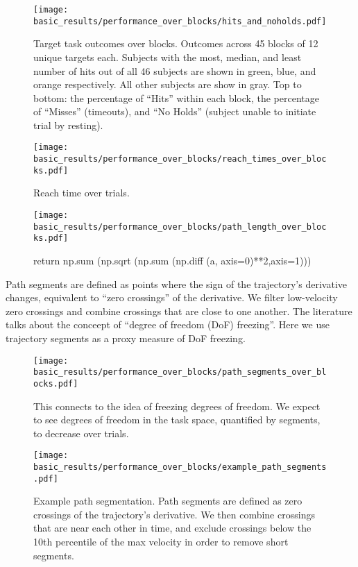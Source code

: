 \documentclass[../main.tex]{subfiles}
\begin{document}
\begin{figure}[H]%
    \centering
    \texttt{[image: basic\_results/performance\_over\_blocks/hits\_and\_noholds.pdf]}
    \caption[Hit counts over trials]{Target task outcomes over blocks. Outcomes across 45 blocks of 12 unique targets each. Subjects with the most, median, and least number of hits out of all 46 subjects are shown in green, blue, and orange respectively. All other subjects are show in gray. Top to bottom: the percentage of ``Hits'' within each block, the percentage of ``Misses'' (timeouts), and ``No Holds'' (subject unable to initiate trial by resting).}\label{fig:hits_and_noholds}
\end{figure}


\begin{figure}[H]%
    \centering
    \texttt{[image: basic\_results/performance\_over\_blocks/reach\_times\_over\_blocks.pdf]}
    \caption[Reach time over trials]{Reach time over trials.}\label{fig:reach_times_over_blocks}
\end{figure}


\begin{figure}[H]%
    \centering
    \texttt{[image: basic\_results/performance\_over\_blocks/path\_length\_over\_blocks.pdf]}
    \caption[Trajectory length over trials]{return np.sum (np.sqrt (np.sum (np.diff (a, axis=0)**2,axis=1)))}\label{fig:path_length_over_blocks}
\end{figure}


Path segments are defined as points where the sign of the trajectory's derivative changes, equivalent to ``zero crossings'' of the derivative. We filter low-velocity zero crossings and combine crossings that are close to one another. The literature talks about the conceept of ``degree of freedom (DoF) freezing''. Here we use trajectory segments as a proxy measure of DoF freezing.

\begin{figure}[H]%
    \centering
    \texttt{[image: basic\_results/performance\_over\_blocks/path\_segments\_over\_blocks.pdf]}
    \caption[Trajectory segments over trials]{This connects to the idea of freezing degrees of freedom. We expect to see degrees of freedom in the task space, quantified by segments, to decrease over trials.}\label{fig:path_segments_over_blocks}
\end{figure}


\begin{figure}[H]%
    \centering
    \texttt{[image: basic\_results/performance\_over\_blocks/example\_path\_segments.pdf]}
    \caption[Example of a path segmented trial]{Example path segmentation. Path segments are defined as zero crossings of the trajectory's derivative. We then combine crossings that are near each other in time, and exclude crossings below the 10th percentile of the max velocity in order to remove short segments.}\label{fig:example_segments}
\end{figure}
\end{document}
